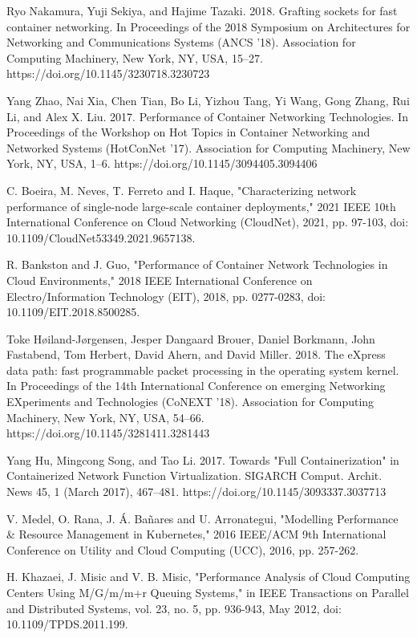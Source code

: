 \documentclass[conference]{IEEEtran}
\begin{document}
\begin{thebibliography}{1}
Ryo Nakamura, Yuji Sekiya, and Hajime Tazaki. 2018. Grafting sockets for fast container networking. In Proceedings of the 2018 Symposium on Architectures for Networking and Communications Systems (ANCS '18). Association for Computing Machinery, New York, NY, USA, 15–27. https://doi.org/10.1145/3230718.3230723

Yang Zhao, Nai Xia, Chen Tian, Bo Li, Yizhou Tang, Yi Wang, Gong Zhang, Rui Li, and Alex X. Liu. 2017. Performance of Container Networking Technologies. In Proceedings of the Workshop on Hot Topics in Container Networking and Networked Systems (HotConNet '17). Association for Computing Machinery, New York, NY, USA, 1–6. https://doi.org/10.1145/3094405.3094406

C. Boeira, M. Neves, T. Ferreto and I. Haque, "Characterizing network performance of single-node large-scale container deployments," 2021 IEEE 10th International Conference on Cloud Networking (CloudNet), 2021, pp. 97-103, doi: 10.1109/CloudNet53349.2021.9657138.

R. Bankston and J. Guo, "Performance of Container Network Technologies in Cloud Environments," 2018 IEEE International Conference on Electro/Information Technology (EIT), 2018, pp. 0277-0283, doi: 10.1109/EIT.2018.8500285.

Toke Høiland-Jørgensen, Jesper Dangaard Brouer, Daniel Borkmann, John Fastabend, Tom Herbert, David Ahern, and David Miller. 2018. The eXpress data path: fast programmable packet processing in the operating system kernel. In Proceedings of the 14th International Conference on emerging Networking EXperiments and Technologies (CoNEXT '18). Association for Computing Machinery, New York, NY, USA, 54–66. https://doi.org/10.1145/3281411.3281443

Yang Hu, Mingcong Song, and Tao Li. 2017. Towards "Full Containerization" in Containerized Network Function Virtualization. SIGARCH Comput. Archit. News 45, 1 (March 2017), 467–481. https://doi.org/10.1145/3093337.3037713

V. Medel, O. Rana, J. Á. Bañares and U. Arronategui, "Modelling Performance \& Resource Management in Kubernetes," 2016 IEEE/ACM 9th International Conference on Utility and Cloud Computing (UCC), 2016, pp. 257-262.

H. Khazaei, J. Misic and V. B. Misic, "Performance Analysis of Cloud Computing Centers Using M/G/m/m+r Queuing Systems," in IEEE Transactions on Parallel and Distributed Systems, vol. 23, no. 5, pp. 936-943, May 2012, doi: 10.1109/TPDS.2011.199.


\end{thebibliography}
\end{document}
